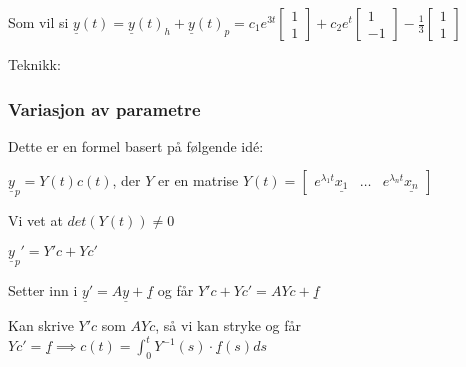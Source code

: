 \documentclass[11pt, a4paper, norsk]{article}
\begin{document}
\begin{Example}{}{}
            Som vil si $\underline{y}(t) = \underline{y}(t)_{h} + \underline{y}(t)_{p} = c_1e^{3t}\begin{bmatrix}
                1 \\
                1
            \end{bmatrix} + c_2e^{t}\begin{bmatrix}
                1 \\
                -1
            \end{bmatrix} - \frac{1}{3}\begin{bmatrix}
                1 \\
                1
            \end{bmatrix}$
            \end{Example}

            Teknikk:
            \subsubsection{Variasjon av parametre}%
            \label{ssub:variasjon_av_parametre}
            
            Dette er en formel basert på følgende idé:

            $\underline{y}_{p} = Y(t) c(t)$, der $Y$ er en matrise $Y(t) = \begin{bmatrix}
                e^{\lambda_1 t}\underline{x_1} & \dots & e^{\lambda_n t}\underline{x_{n}} 
            \end{bmatrix}$

            Vi vet at $det(Y(t)) \neq 0$

            $\underline{y}_{p}' = Y'c + Yc'$ 

            Setter inn i $\underline{y}' = A\underline{y} + \underline{f}$ og får $Y'c + Yc' = AYc + \underline{f}$

            Kan skrive $Y'c$ som $AYc$, så vi kan stryke og får $Yc' = \underline{f} \implies c(t) = \int_{0}^{t}Y^{-1}(s)\cdot \underline{f}(s)ds$
\end{document}
